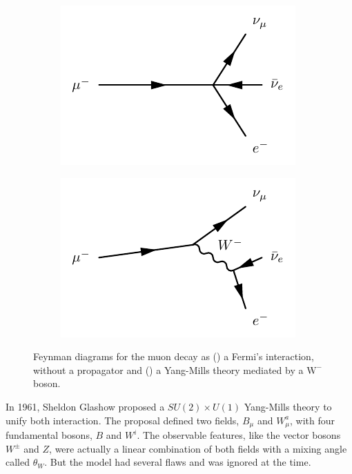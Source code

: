 \begin{figure}
\centering
\begin{subfigure}[b]{0.5\textwidth}
  \centering
  \includegraphics[width=\textwidth]{Images/fermi1.pdf}
  \caption{\label{fig:fermi_int}}
\end{subfigure}%
\begin{subfigure}[b]{0.5\textwidth}
  \centering
  \includegraphics[width=\textwidth]{Images/fermi2.pdf}
  \caption{\label{fig:melectroweak}}
\end{subfigure}
\caption{Feynman diagrams for the muon decay as () a Fermi's interaction, without a propagator and () a Yang-Mills theory mediated by a $\mathrm{W}^{-}$ boson.}
\label{fig:etomununu}
\end{figure}

In 1961, Sheldon Glashow proposed a $SU(2) \times U(1)$ Yang-Mills theory \cite{GLASHOW1961579} to unify both interaction.  The proposal defined two fields, $B_{\mu}$ and $W_{\mu}^a$, with four fundamental bosons, $B$ and $W^i$. The observable features, like the vector bosons $W^{\pm}$ and $Z$, were actually a linear combination of both fields with a mixing angle called $\theta_W$. But the model had several flaws and was ignored at the time.

